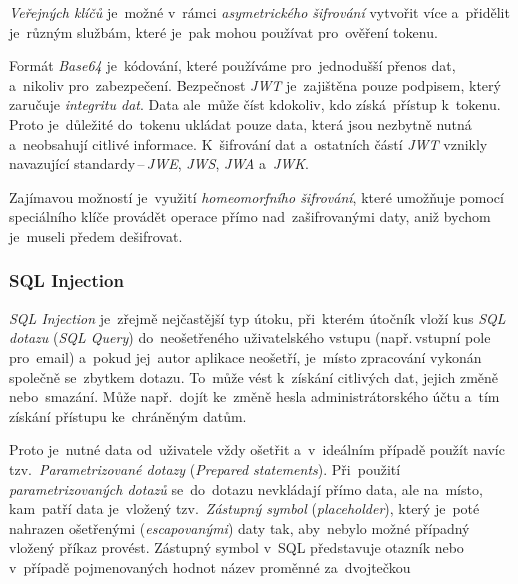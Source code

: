 \documentclass[10pt,a4paper]{article}
\begin{document}
            \emph{Veřejných klíčů} je~možné v~rámci \emph{asymetrického šifrování} vytvořit více a~přidělit je~různým službám, které je~pak mohou používat pro~ověření tokenu.

            Formát \emph{Base64} je~kódování, které používáme pro~jednodušší přenos dat, a~nikoliv pro~zabezpečení. Bezpečnost \emph{JWT} je~zajištěna pouze podpisem, který zaručuje \emph{integritu dat}. Data ale~může číst kdokoliv, kdo získá~přístup k~tokenu. Proto je~důležité do~tokenu ukládat pouze data, která jsou nezbytně nutná a~neobsahují citlivé informace. K~šifrování dat a~ostatních částí \emph{JWT} vznikly navazující standardy\,--\,\emph{JWE}, \emph{JWS}, \emph{JWA} a~\emph{JWK}. \cite{jwtesak}

            Zajímavou možností je~využití \emph{homeomorfního šifrování}, které umožňuje pomocí speciálního klíče provádět operace přímo nad~zašifrovanými daty, aniž bychom je~museli předem dešifrovat. \cite{graham2021ethical}

            \subsubsection{SQL Injection}
            \emph{SQL Injection} je~zřejmě nejčastější typ útoku, při~kterém útočník vloží kus \emph{SQL dotazu} (\emph{SQL Query}) do~neošetřeného uživatelského vstupu (např.\,vstupní pole pro~email) a~pokud jej~autor aplikace neošetří, je~místo zpracování vykonán společně se~zbytkem dotazu. To~může vést k~získání citlivých dat, jejich změně nebo~smazání. Může např.~dojít ke~změně hesla administrátorského účtu a~tím získání přístupu ke~chráněným datům.

            Proto je~nutné data od~uživatele vždy ošetřit a~v~ideálním případě použít navíc tzv.~\emph{Parametrizované dotazy} (\emph{Prepared statements}). Při~použití \emph{parametrizovaných dotazů} se~do~dotazu nevkládají přímo data, ale na~místo, kam~patří data je~vložený tzv.~\emph{Zástupný symbol} (\emph{placeholder}), který je~poté nahrazen ošetřenými (\emph{escapovanými}) daty tak, aby~nebylo možné případný vložený příkaz provést. Zástupný symbol v~SQL představuje otazník  nebo v~případě pojmenovaných hodnot název proměnné za~dvojtečkou  \cite{graham2021ethical}
            
\end{document}
